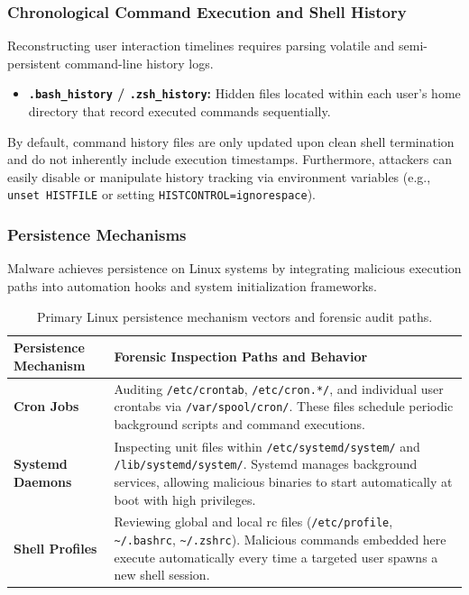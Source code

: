 \subsubsection*{Chronological Command Execution and Shell History}
Reconstructing user interaction timelines requires parsing volatile and semi-persistent command-line history logs.
\begin{itemize}
    \item \textbf{\texttt{.bash\_history} / \texttt{.zsh\_history}:} Hidden files located within each user's home directory that record executed commands sequentially.
\end{itemize}

\noindent
By default, command history files are only updated upon clean shell termination and do not inherently include execution timestamps. Furthermore, attackers can easily disable or manipulate history tracking via environment variables (e.g., \texttt{unset HISTFILE} or setting \texttt{HISTCONTROL=ignorespace}).

\subsubsection{Persistence Mechanisms}
Malware achieves persistence on Linux systems by integrating malicious execution paths into automation hooks and system initialization frameworks.

\begin{table}[H]
\centering
\small
\begin{tabular}{|p{3.5cm}|p{8.5cm}|}
\hline
\textbf{Persistence Mechanism} & \textbf{Forensic Inspection Paths and Behavior} \\
\hline
\textbf{Cron Jobs} & Auditing \texttt{/etc/crontab}, \texttt{/etc/cron.*/}, and individual user crontabs via \texttt{/var/spool/cron/}. These files schedule periodic background scripts and command executions. \\
\hline
\textbf{Systemd Daemons} & Inspecting unit files within \texttt{/etc/systemd/system/} and \texttt{/lib/systemd/system/}. Systemd manages background services, allowing malicious binaries to start automatically at boot with high privileges. \\
\hline
\textbf{Shell Profiles} & Reviewing global and local rc files (\texttt{/etc/profile}, \texttt{\textasciitilde/.bashrc}, \texttt{\textasciitilde/.zshrc}). Malicious commands embedded here execute automatically every time a targeted user spawns a new shell session. \\
\hline
\end{tabular}
\caption{Primary Linux persistence mechanism vectors and forensic audit paths.}
\end{table}

